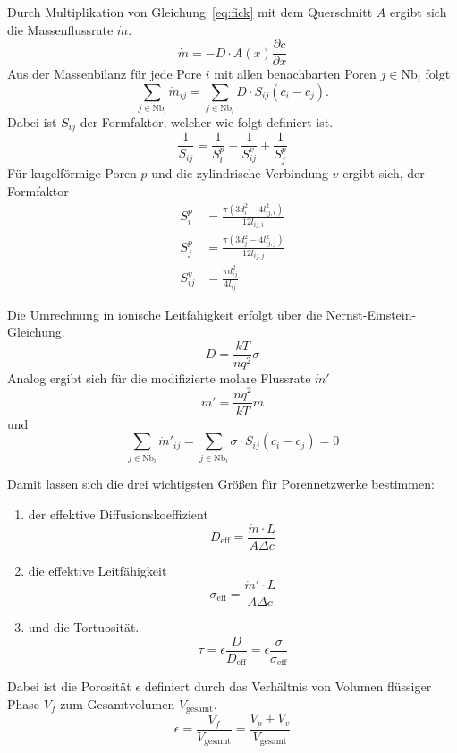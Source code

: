 Durch Multiplikation von Gleichung~\ref{eq:fick} mit dem Querschnitt $A$ ergibt sich die Massenflussrate $\dot{m}$.
\begin{equation}
\dot{m} = -D \cdot A(x) \frac{\partial c}{\partial x}
\end{equation}
Aus der Massenbilanz für jede Pore $i$  mit allen benachbarten Poren $ j \in \text{Nb}_i $ folgt
\begin{equation}
\sum_{j \in \text{Nb}_i} \dot{m}_{ij} = \sum_{j \in \text{Nb}_i} D \cdot S_{ij} (c_i - c_j).
\end{equation}
Dabei ist $S_{ij}$ der Formfaktor, welcher wie folgt definiert ist.
\begin{equation}
\frac{1}{S_{ij}} = \frac{1}{S^p_i} + \frac{1}{S^v_{ij}} + \frac{1}{S^p_j}
\end{equation}
Für kugelförmige Poren $p$ und die zylindrische Verbindung $v$ ergibt sich, der Formfaktor
\begin{align}
S^p_i &= \frac{\pi (3d_i^2 - 4l_{ij,i}^2)}{12l_{ij,i}} \\
S^p_j &= \frac{\pi (3d_j^2 - 4l_{ij,j}^2)}{12l_{ij,j}} \\
S^v_{ij} &= \frac{\pi d_{ij}^2}{4l_{ij}}
\end{align}

Die Umrechnung in ionische Leitfähigkeit erfolgt über die Nernst-Einstein-Gleichung.
\begin{equation}
D = \frac{kT}{nq^2} \sigma
\end{equation}
Analog ergibt sich für die modifizierte molare Flussrate $\dot{m}'$
\begin{equation}
\dot{m}' = \frac{nq^2}{kT} \dot{m}
\end{equation}
und
\begin{equation}
\sum_{j \in \text{Nb}_i} \dot{m}'_{ij} = \sum_{j \in \text{Nb}_i} \sigma \cdot S_{ij} (c_i - c_j) = 0
\end{equation}

Damit lassen sich die drei wichtigsten Größen für Porennetzwerke bestimmen:
\begin{enumerate}
    \item der effektive Diffusionskoeffizient
    \begin{equation}
    D_\text{eff} = \frac{\dot{m} \cdot L}{A \Delta c}
    \end{equation}
    \item die effektive Leitfähigkeit
    \begin{equation}
    \sigma_\text{eff} = \frac{\dot{m}' \cdot L}{A \Delta c}
    \end{equation}
    \item und die Tortuosität.
    \begin{equation}
    \tau = \epsilon \frac{D}{D_\text{eff}} = \epsilon \frac{\sigma}{\sigma_\text{eff}}
    \end{equation}
\end{enumerate}
Dabei ist die Porosität $\epsilon$ definiert durch das Verhältnis von Volumen flüssiger Phase $V_f$ zum Gesamtvolumen $V_{\text{gesamt}}$.
\begin{equation}
\epsilon = \frac{V_f}{V_{\text{gesamt}}} = \frac{V_p + V_v}{V_{\text{gesamt}}}
\end{equation}

